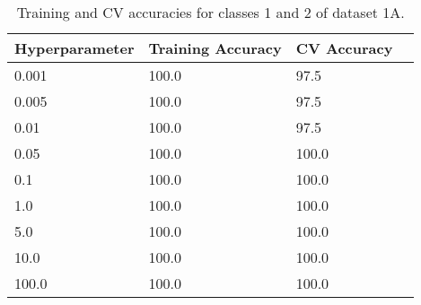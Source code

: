 \def\arraystretch{1.25}
\begin{table}[H]
{\small
\centering
\begin{tabular}{l l l c}
\hline
\hline
\textbf{Hyperparameter} & \textbf{Training Accuracy} & \textbf{CV Accuracy}\\
\hline
\hline
0.001 & 100.0 & 97.5\\
0.005 & 100.0 & 97.5\\
0.01 & 100.0 & 97.5\\
0.05 & 100.0 & 100.0\\
0.1 & 100.0 & 100.0\\
1.0 & 100.0 & 100.0\\
5.0 & 100.0 & 100.0\\
10.0 & 100.0 & 100.0\\
100.0 & 100.0 & 100.0\\
\hline
\end{tabular}
\caption{Training and CV accuracies for classes 1 and 2 of dataset 1A.}
}
\end{table}
